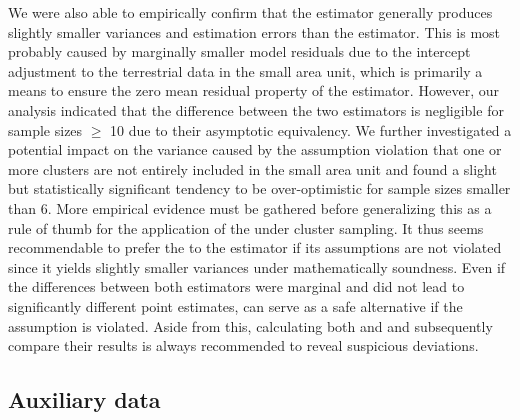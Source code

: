 We were also able to empirically confirm that the \extpsynth{} estimator generally produces slightly smaller variances and estimation errors than the \psmall{} estimator. This is most probably caused by marginally smaller model residuals due to the intercept adjustment to the terrestrial data in the small area unit, which is primarily a means to ensure the zero mean residual property of the \extpsynth{} estimator. However, our analysis indicated that the difference between the two estimators is negligible for sample sizes $\geq$ 10 due to their asymptotic equivalency. We further investigated a potential impact on the \extpsynth{} variance caused by the assumption violation that one or more clusters are not entirely included in the small area unit and found a slight but statistically significant tendency to be over-optimistic for sample sizes smaller than 6. More empirical evidence must be gathered before generalizing this as a rule of thumb for the application of the \extpsynth{} under cluster sampling. It thus seems recommendable to prefer the \extpsynth{} to the \psmall{} estimator if its assumptions are not violated since it yields slightly smaller variances under mathematically soundness. Even if the differences between both estimators were marginal and did not lead to significantly different point estimates, \psmall{} can serve as a safe alternative if the \extpsynth{} assumption is violated. Aside from this, calculating both \psmall{} and \extpsynth{} and subsequently compare their results is always recommended to reveal suspicious deviations.\par


\subsection{Auxiliary data}


